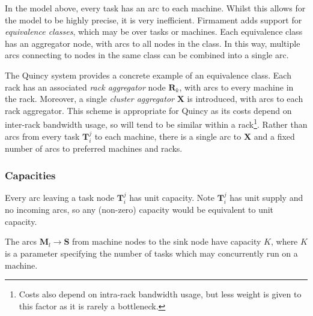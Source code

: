 In the model above, every task has an arc to each machine. Whilst this allows for the model to be highly precise, it is very inefficient\footnotemark.
Firmament adds support for \emph{equivalence classes}, which may be over tasks or machines\footnotemark. Each equivalence class has an aggregator node, with arcs to all nodes in the class. In this way, multiple arcs connecting to nodes in the same class can be combined into a single arc.

The Quincy system provides a concrete example of an equivalence class. Each rack has an associated \emph{rack aggregator} node $\mathbf{R}_k$, with arcs to every machine in the rack. Moreover, a single \emph{cluster aggregator} $\mathbf{X}$ is introduced, with arcs to each rack aggregator. This scheme is appropriate for Quincy as its costs depend on inter-rack bandwidth usage, so will tend to be similar within a rack\footnote{Costs also depend on intra-rack bandwidth usage, but less weight is given to this factor as it is rarely a bottleneck.}. Rather than arcs from every task $\mathbf{T}_i^j$ to each machine, there is a single arc to $\mathbf{X}$ and a fixed number of arcs to preferred machines and racks.

\subsubsection{Capacities}

Every arc leaving a task node $\mathbf{T}_i^j$ has unit capacity. Note $\mathbf{T}_i^j$ has unit supply and no incoming arcs, so any (non-zero) capacity would be equivalent to unit capacity.

The arcs $\mathbf{M}_l \to \mathbf{S}$ from machine nodes to the sink node have capacity $K$, where $K$ is a parameter specifying the number of tasks which may concurrently run on a machine\footnotemark.

